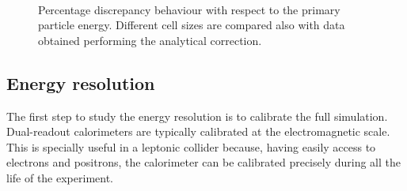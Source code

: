 \begin{figure}
	\centering
	 \\
	\caption{Percentage discrepancy behaviour with respect to the primary particle energy. Different cell sizes are compared also with data obtained performing the analytical correction.}
	\label{fig:sat_vs_E}
\end{figure}

\subsection{Energy resolution} \label{subsec:E_res}
The first step to study the energy resolution is to calibrate the full simulation.\\
Dual-readout calorimeters are typically calibrated at the electromagnetic scale. This is specially useful in a leptonic collider because, having easily access to electrons and positrons, the calorimeter can be calibrated precisely during all the life of the experiment.\\

